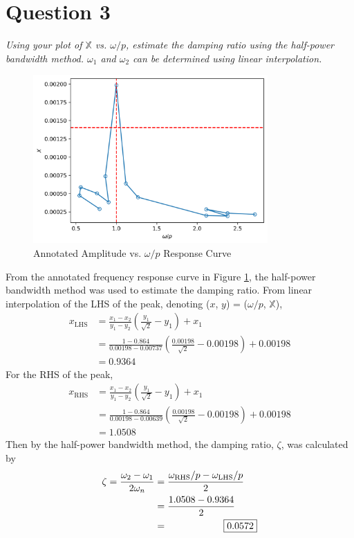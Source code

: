\section{Question 3}
\textit{Using your plot of $\mathbb{X}$ vs. $\omega/p$, estimate the damping ratio using the half-power bandwidth method. $\omega_1$ and $\omega_2$ can be determined using linear interpolation.}
\begin{figure}[H]
    \centering
    \includegraphics[width=0.8\textwidth]{Questions/Plots/X_vs_omega_p_with_lines.png}
    \caption{Annotated Amplitude vs. $\omega/p$ Response Curve}
    \label{fig:frequency_response_curve_with_lines}
\end{figure}
From the annotated frequency response curve in Figure \ref{fig:frequency_response_curve_with_lines}, the half-power bandwidth method was used to estimate the damping ratio. From linear interpolation of the LHS of the peak, denoting ($x$, $y$) = ($\omega/p$, $\mathbb{X}$), 
\begin{align*}
    x_{\text{LHS}} &= \frac{x_1 - x_2}{y_1 - y_2} \left(\frac{y_1}{\sqrt{2}} - y_1\right) + x_1 \\
    &= \frac{1 - 0.864}{0.00198 - 0.00737} \left(\frac{0.00198}{\sqrt{2}} - 0.00198\right) + 0.00198 \\
    &= 0.9364 
\end{align*}
For the RHS of the peak,
\begin{align*}
    x_{\text{RHS}} &= \frac{x_1 - x_2}{y_1 - y_2} \left(\frac{y_1}{\sqrt{2}} - y_1\right) + x_1 \\
    &= \frac{1 - 0.864}{0.00198 - 0.00639} \left(\frac{0.00198}{\sqrt{2}} - 0.00198\right) + 0.00198 \\
    &= 1.0508
\end{align*}
Then by the half-power bandwidth method, the damping ratio, $\zeta$, was calculated by
\begin{align*}
    \zeta = \frac{\omega_2 - \omega_1}{2\omega_n} &= \frac{\omega_{\text{RHS}}/p - \omega_{\text{LHS}}/p}{2} \\
    &= \frac{1.0508 - 0.9364}{2} \\
    &= \Aboxed{0.0572}
\end{align*}

